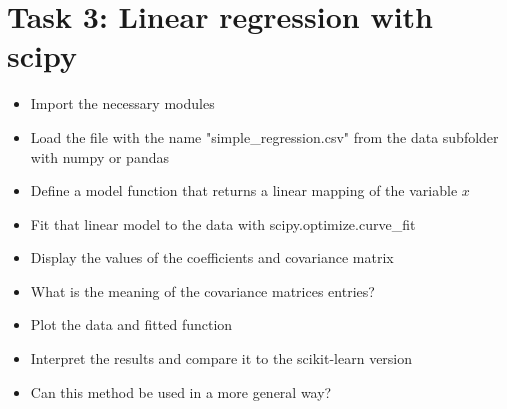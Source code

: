 \documentclass{article}
\begin{document}
\section*{Task 3: Linear regression with scipy}
\begin{itemize}
    \item Import the necessary modules
    \item Load the file with the name "simple\_regression.csv" from the data subfolder with numpy or pandas 
    \item Define a model function that returns a linear mapping of the variable $x$
    \item Fit that linear model to the data with scipy.optimize.curve\_fit
    \item Display the values of the coefficients and covariance matrix
    \item What is the meaning of the covariance matrices entries?
    \item Plot the data and fitted function
    \item Interpret the results and compare it to the scikit-learn version
    \item Can this method be used in a more general way?
\end{itemize}

%
%
\end{document}
